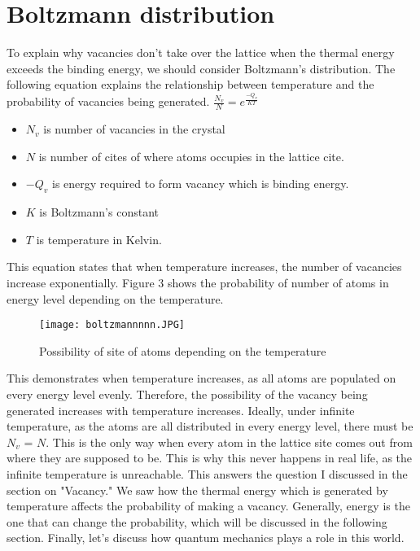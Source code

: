 \documentclass{article}
\begin{document}
\section{Boltzmann distribution}
To explain why vacancies don't take over the lattice when the thermal energy exceeds the binding energy, we should consider Boltzmann's distribution. 
The following equation explains the relationship between temperature and the probability of vacancies being generated. 
\LARGE
$\frac{N_v}{N} = e^\frac{-Q_v}{KT}\ $     
\\
\normalsize
\begin{itemize}
    \item $ N_v$ is number of vacancies in the crystal 
    \item $ N$ is number of cites of where atoms occupies in the lattice cite. 
    \item $-Q_v$ is energy required to form vacancy which is binding energy.
    \item $K$ is Boltzmann's constant 
    \item $T$ is temperature in Kelvin. 
\end{itemize}

This equation states that when temperature increases, the number of vacancies increase exponentially. 
Figure 3 shows the probability of number of atoms in energy level depending on the temperature.
\\
\begin{figure}
    \centering
    \texttt{[image: boltzmannnnn.JPG]}
    \caption{Possibility of site of atoms depending on the temperature}
    \label{fig:l}
\end{figure}
This demonstrates when temperature increases, as all atoms are populated on every energy level evenly. Therefore, the possibility of the vacancy being generated increases with temperature increases. 
Ideally, under infinite temperature, as the atoms are all distributed in every energy level, there must be $N_v$ = $N$. 
This is the only way when every atom in the lattice site comes out from where they are supposed to be.
This is why this never happens in real life, as the infinite temperature is unreachable. 
This answers the question I discussed in the section on "Vacancy." 
We saw how the thermal energy which is generated by temperature affects the probability of making a vacancy. 
Generally, energy is the one that can change the probability, which will be discussed in the following section.
Finally, let's discuss how quantum mechanics plays a role in this world. 
\end{document}

